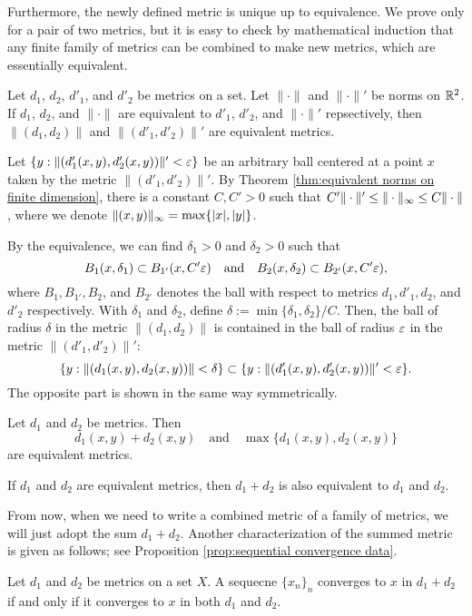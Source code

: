 \documentclass{../crs}
\begin{document}
Furthermore, the newly defined metric is unique up to equivalence.
We prove only for a pair of two metrics, but it is easy to check by mathematical induction that any finite family of metrics can be combined to make new metrics, which are essentially equivalent.

\begin{prop}
Let $d_1$, $d_2$, $d'_1$, and $d'_2$ be metrics on a set.
Let $\|\cdot\|$ and $\|\cdot\|'$ be norms on $\mathbb{R}^2$.
If $d_1$, $d_2$, and $\|\cdot\|$ are equivalent to $d'_1$, $d'_2$, and $\|\cdot\|'$ repsectively, then $\|(d_1,d_2)\|$ and $\|(d'_1,d'_2)\|'$ are equivalent metrics.
\end{prop}
\begin{pf}
Let $\{y:\|(d'_1(x,y),d'_2(x,y))\|'<\varepsilon\}$ be an arbitrary ball centered at a point $x$ taken by the metric $\|(d'_1,d'_2)\|'$.
By Theorem \ref{thm:equivalent norms on finite dimension}, there is a constant $C,C'>0$ such that $C'\|\cdot\|'\le\|\cdot\|_\infty\le C\|\cdot\|$, where we denote $\|(x,y)\|_\infty=\max\{|x|,|y|\}$.

By the equivalence, we can find $\delta_1>0$ and $\delta_2>0$ such that
\[B_1(x,\delta_1)\subset B_{1'}(x,C'\varepsilon)\quad\text{and}\quad B_2(x,\delta_2)\subset B_{2'}(x,C'\varepsilon),\]
where $B_1,B_{1'},B_2$, and $B_{2'}$ denotes the ball with respect to metrics $d_1,d'_1,d_2$, and $d'_2$ respectively.
With $\delta_1$ and $\delta_2$, define $\delta:=\min\{\delta_1,\delta_2\}/C$.
Then, the ball of radius $\delta$ in the metric $\|(d_1,d_2)\|$ is contained in the ball of radius $\varepsilon$ in the metric $\|(d'_1,d'_2)\|'$:
\[\{y:\|(d_1(x,y),d_2(x,y))\|<\delta\}\subset\{y:\|(d'_1(x,y),d'_2(x,y))\|'<\varepsilon\}.\]
The opposite part is shown in the same way symmetrically.
\end{pf}

\begin{ex}
Let $d_1$ and $d_2$ be metrics.
Then
\[d_1(x,y)+d_2(x,y)\quad\text{and}\quad\max\{d_1(x,y),d_2(x,y)\}\]
are equivalent metrics.
\end{ex}
\begin{ex}
If $d_1$ and $d_2$ are equivalent metrics, then $d_1+d_2$ is also equivalent to $d_1$ and $d_2$.
\end{ex}

From now, when we need to write a combined metric of a family of metrics, we will just adopt the sum $d_1+d_2$.
Another characterization of the summed metric is given as follows; see Proposition \ref{prop:sequential convergence data}.

\begin{prop}
Let $d_1$ and $d_2$ be metrics on a set $X$.
A sequecne $\{x_n\}_n$ converges to $x$ in $d_1+d_2$ if and only if it converges to $x$ in both $d_1$ and $d_2$.
\end{prop}
\begin{pf}
\end{pf}
\end{document}
